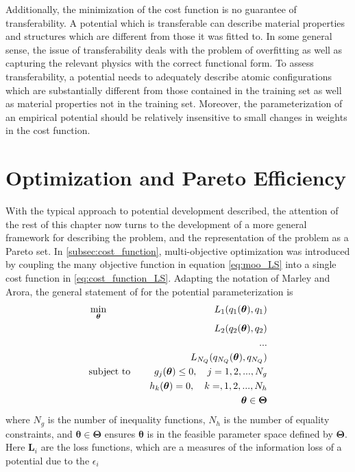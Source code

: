 Additionally, the minimization of the cost function is no guarantee of transferability.  A potential which is transferable can describe material properties and structures which are different from those it was fitted to.  In some general sense, the issue of transferability deals with the problem of overfitting as well as capturing the relevant physics with the correct functional form.  To assess transferability, a potential needs to adequately describe atomic configurations which are substantially different from those contained in the training set as well as material properties not in the training set.  Moreover, the parameterization of an empirical potential should be relatively insensitive to small changes in weights in the cost function.

\section{Optimization and Pareto Efficiency}

With the typical approach to potential development described, the attention of the rest of this chapter now turns to the development of a more general framework for describing the problem, and the representation of the problem as a Pareto set.  In \ref{subsec:cost_function}, multi-objective optimization was introduced by coupling the many objective function in equation \ref{eq:moo_LS} into a single cost function in \ref{eq:cost_function_LS}.  Adapting the notation of Marley and Arora\cite{marler2004_moo_survey}, the general statement of for the potential parameterization is
\begin{subequations}
	\label{eq:moo}
\begin{align}
  &\min_{\bm{\theta}}	\quad
	  &L_1(q_1(\bm{\theta}),q_1) \\
	&	&L_2(q_2(\bm{\theta}),q_2) \notag \\
	& &... \notag \\
	&	&L_{N_Q}(q_{N_Q}(\bm{\theta}),q_{N_Q}) \notag \\
  &\text{subject to} \quad
	  &g_j(\bm{\theta}) \leq 0, \quad j=1,2,...,N_g \\
	& &h_k(\bm{\theta}) = 0, \quad k=,1,2,...,N_h \\
	& &\bm{\theta} \in \bm{\Theta}
\end{align}
\end{subequations}
where $N_g$ is the number of inequality functions, $N_h$ is the number of equality constraints, and $\bm{\theta} \in \bm{\Theta}$ ensures $\bm{\theta}$ is in the feasible parameter space defined by $\bm{\Theta}$.  Here $\bm{L}_i$ are the loss functions, which are a measures of the information loss of a potential due to the $\epsilon_i$

